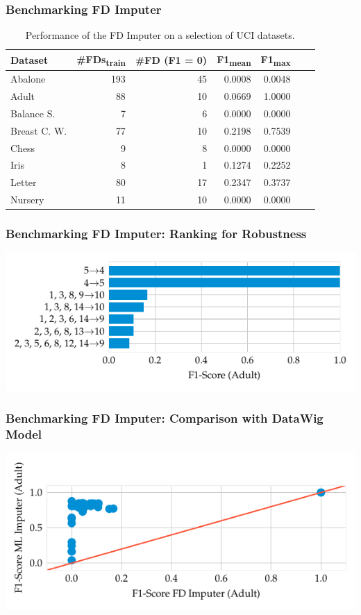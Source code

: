 \documentclass{beamer}
\begin{document}
\begin{frame}
    \frametitle{Benchmarking FD Imputer}
    \begin{table}[ht]
        \centering
        \begin{tabular}{lrrrrrr}
            \toprule
            \toprule
            Dataset & \#FDs\textsubscript{train} & \#FD (F1 = 0) & F1\textsubscript{mean} & F1\textsubscript{max} \\
            \midrule
            Abalone & 193 & 45 & 0.0008 & 0.0048 \\
            Adult & 88 & 10 & 0.0669 & 1.0000 \\
            Balance S. & 7 & 6 & 0.0000 & 0.0000 \\
            Breast C. W. & 77 & 10 & 0.2198 & 0.7539 \\
            Chess & 9 & 8 & 0.0000 & 0.0000 \\
            Iris & 8 & 1 & 0.1274 & 0.2252 \\
            Letter & 80 & 17 & 0.2347 & 0.3737 \\
            Nursery & 11 & 10 & 0.0000 & 0.0000  \\
            \bottomrule
            \bottomrule
        \end{tabular}
        \caption{Performance of the FD Imputer on a selection of UCI datasets.}\label{tab:fd-imputer-performance}
    \end{table}
\end{frame}

\begin{frame}
    \frametitle{Benchmarking FD Imputer: Ranking for Robustness}
    \includegraphics[width=\textwidth]{f1_fd_imputer.pdf}
\end{frame}

\begin{frame}
    \frametitle{Benchmarking FD Imputer: Comparison with DataWig Model}
    \includegraphics[width=\textwidth]{f1_ml_fd.pdf}
\end{frame}
\end{document}
